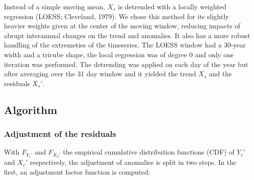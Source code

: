 \documentclass[letterpaper,10pt]{article}
\begin{document}
Instead of a simple moving mean, $X_s$ is detrended with a locally weighted regression (LOESS; Cleveland, 1979).
We chose this method for its slightly heavier weights given at the center of the moving window, reducing impacts of abrupt interannual changes on the trend and anomalies. It also has a more robust handling of the extremeties of the timeseries. The LOESS window had a 30-year width and a tricube shape, the local regression was of degree 0 and only one iteration was performed. The detrending was applied on each day of the year but after averaging over the 31 day window and it yielded the trend $\overline{X_s}$ and the residuals $X_s'$.

\subsection{Algorithm}
\subsubsection{Adjustment of the residuals}
With $F_{Y_r'}$ and $F_{X_h'}$ the empirical cumulative distribution functions (CDF) of $Y_r'$ and $X_r'$ respectively, the adjustment of anomalies is split in two steps. In the first, an adjustment factor function is computed:
\end{document}
